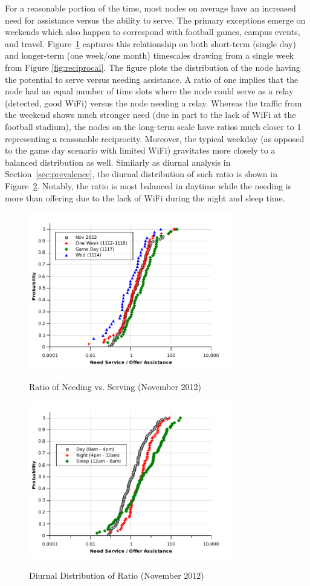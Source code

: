 For a reasonable portion of the time, most nodes on average have an increased need for assistance versus the ability to serve.  The primary exceptions emerge on weekends which also happen to correspond with football games, campus events, and travel.  
Figure~\ref{fig:1117} captures this relationship on both short-term (single day) and longer-term (one week/one month) timescales drawing from a single week from Figure \ref{fig:reciprocal}.  The figure plots the distribution of the node having the potential to serve versus needing assistance.  A ratio of one implies that the node had an equal number of time slots where the node could serve as a relay (detected, good WiFi) versus the node needing a relay.   Whereas the traffic from the weekend shows much stronger need (due in part to the lack of WiFi at the football stadium), the nodes on the long-term scale have ratios much closer to 1 representing a reasonable reciprocity.  Moreover, the typical weekday (as opposed to the game day scenario with limited WiFi) gravitates more closely to a balanced distribution as well.  Similarly as diurnal analysis in Section~\ref{sec:prevalence}, the diurnal distribution of such ratio is shown in Figure~\ref{fig:diurnal_ratio}. Notably, the ratio is most balanced in daytime while the needing is more than offering due to the lack of WiFi during the night and sleep time. 

\begin{figure}[tbp]
\centering 
{\includegraphics[width=3.5in]{graphs/1117_2.pdf}}
\caption{Ratio of Needing vs. Serving (November 2012)} 
\label{fig:1117}
\end{figure} 

\begin{figure}[tbp]
\centering 
{\includegraphics[width=3.5in]{graphs/diurnal_ratio.pdf}}
\caption{Diurnal Distribution of Ratio (November 2012)} 
\label{fig:diurnal_ratio}
\end{figure} 

